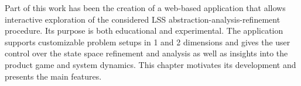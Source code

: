 Part of this work has been the creation of a web-based application that allows interactive exploration of the considered LSS abstraction-analysis-refinement procedure.
Its purpose is both educational and experimental.
The application supports customizable problem setups in 1 and 2 dimensions and gives the user control over the state space refinement and analysis as well as insights into the product game and system dynamics.
This chapter motivates its development and presents the main features.


